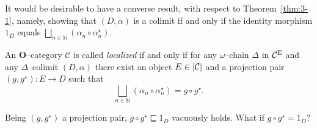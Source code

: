 It would be desirable to have a converse result, with respect to Theorem~\ref{thm:3-1}, namely, showing that \((D,\alpha)\) is a colimit if and only if the identity morphism \(1_D\) equals \(\bigsqcup_{n \in \mathbb{N}}(\alpha_n \circ \alpha_n^\star)\).

\begin{dfn}\label{dfn:localized}
  An \(\mathbf{O}\)--category \(\mathcal{C}\) is called \emph{localized} if and only if for any \(\omega\)--chain \(\Delta\) in \(\mathcal{C}^\textup{E}\) and any \(\Delta\)--colimit \((D,\alpha)\) there exist an object \(E \in \lvert \mathcal{C} \rvert\) and a projection pair \((g,g^\star) \colon E \to D\) such that %
  \begin{equation*}
    \bigsqcup_{n \in \mathbb{N}}(\alpha_n \circ \alpha_n^\star) = g \circ g^\star.
  \end{equation*}
\end{dfn}

Being \((g,g^\star)\) a projection pair, \(g \circ g^\star \sqsubseteq 1_D\) vacuously holds. What if \(g \circ g^\star = 1_D\)?

